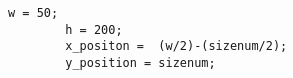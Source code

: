 \begin{lstlisting}[numbers=none]
		w = 50;
		h = 200;
		x_positon =  (w/2)-(sizenum/2);
		y_position = sizenum;
	
\end{lstlisting}